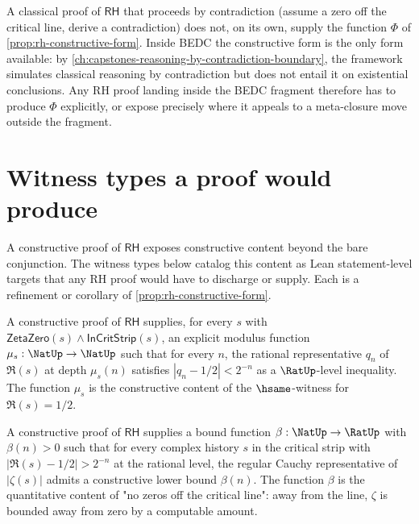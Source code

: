 \begin{remark}
\label{rem:rh-strictly-stronger}
A classical proof of $\mathsf{RH}$ that proceeds by contradiction (assume a zero off the critical line, derive a contradiction) does not, on its own, supply the function $\Phi$ of \autoref{prop:rh-constructive-form}. Inside BEDC the constructive form is the only form available: by \autoref{ch:capstones-reasoning-by-contradiction-boundary}, the framework simulates classical reasoning by contradiction but does not entail it on existential conclusions. Any RH proof landing inside the BEDC fragment therefore has to produce $\Phi$ explicitly, or expose precisely where it appeals to a meta-closure move outside the fragment.
\end{remark}

\section{Witness types a proof would produce}
\label{sec:rh-witness-types}

A constructive proof of $\mathsf{RH}$ exposes constructive content beyond the bare conjunction. The witness types below catalog this content as Lean statement-level targets that any RH proof would have to discharge or supply. Each is a refinement or corollary of \autoref{prop:rh-constructive-form}.

\begin{theorem}
\label{thm:rh-witness-modulus}
A constructive proof of $\mathsf{RH}$ supplies, for every $s$ with $\mathsf{ZetaZero}(s) \wedge \mathsf{InCritStrip}(s)$, an explicit modulus function $\mu_s : \NatUp \to \NatUp$ such that for every $n$, the rational representative $q_n$ of $\Re(s)$ at depth $\mu_s(n)$ satisfies $|q_n - 1/2| < 2^{-n}$ as a $\RatUp$-level inequality. The function $\mu_s$ is the constructive content of the $\hsame$-witness for $\Re(s) = 1/2$.
\end{theorem}

\begin{theorem}
\label{thm:rh-witness-approach-rate}
A constructive proof of $\mathsf{RH}$ supplies a bound function $\beta : \NatUp \to \RatUp$ with $\beta(n) > 0$ such that for every complex history $s$ in the critical strip with $|\Re(s) - 1/2| > 2^{-n}$ at the rational level, the regular Cauchy representative of $|\zeta(s)|$ admits a constructive lower bound $\beta(n)$. The function $\beta$ is the quantitative content of "no zeros off the critical line": away from the line, $\zeta$ is bounded away from zero by a computable amount.
\end{theorem}

